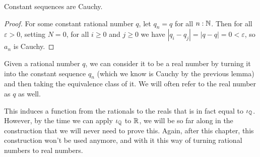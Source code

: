 \documentclass[../../math.tex]{subfiles}
\begin{document}
\begin{lemma}
    Constant sequences are Cauchy.
\end{lemma}
\begin{proof}
    For some constant rational number $q$, let $q_n = q$ for all $n : \mathbb{N}$.  Then
    for all $\varepsilon > 0$, setting $N = 0$, for all $i \geq 0$ and $j \geq
    0$ we have $|q_i - q_j| = |q - q| = 0 < \varepsilon$, so $a_n$ is Cauchy.
\end{proof}

\begin{definition}
    Given a rational number $q$, we can consider it to be a real number by
    turning it into the constant sequence $q_n$ (which we know is Cauchy by the
    previous lemma) and then taking the equivalence class of it.  We will often
    refer to the real number as $q$ as well.
\end{definition}

This induces a function from the rationals to the reals that is in fact equal to
$\iota_{\mathbb{Q}}$.  However, by the time we can apply $\iota_{\mathbb{Q}}$ to $\mathbb{R}$, we will be so far along
in the construction that we will never need to prove this.  Again, after this
chapter, this construction won't be used anymore, and with it this way of
turning rational numbers to real numbers.
\end{document}
